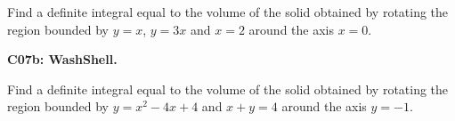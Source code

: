 \documentclass[12pt]{article}
\newcommand{\<}{\left\langle}
\renewcommand{\>}{\right\rangle}
\newcommand{\exerciseHeader}[4]{


  \vspace{0.5em}
  \textbf{#2}
  \vspace{0.5em}

}
\begin{document}
\begin{multicols}{2}
Find a definite integral equal to the volume of the solid obtained by
rotating the region bounded by \(y=x\), \(y=3x\) and \(x=2\) around
the axis \(x=0\).

\exerciseHeader{2017 July 07}{C07b: WashShell.}{
Use the washer or cylindrical shell method to express a volume of
revolution as a definite integral.
}{Extra2}

Find a definite integral equal to the volume of the solid obtained by
rotating the region bounded by
\(y=x^2-4x+4\) and \(x+y=4\) around
the axis \(y=-1\).



%

%

%

%

%


\end{multicols}
\end{document}
